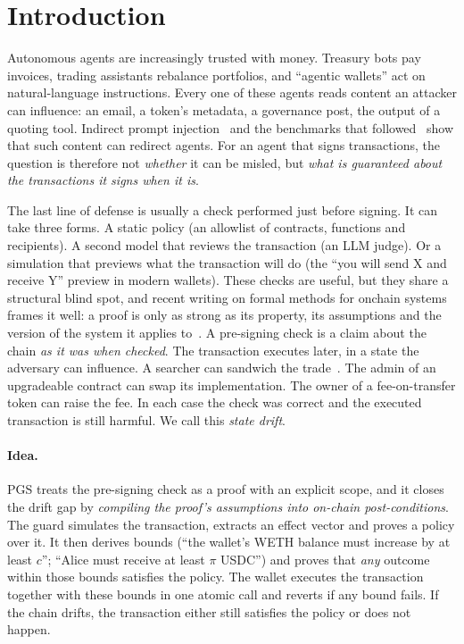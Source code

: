 \documentclass[11pt]{article}
\newcommand{\pgs}{\textsc{PGS}}
\begin{document}
\section{Introduction}
Autonomous agents are increasingly trusted with money. Treasury bots pay invoices, trading assistants rebalance portfolios, and ``agentic wallets'' act on natural-language instructions. Every one of these agents reads content an attacker can influence: an email, a token's metadata, a governance post, the output of a quoting tool. Indirect prompt injection~\cite{greshake2023not} and the benchmarks that followed~\cite{zhan2024injecagent,debenedetti2024agentdojo} show that such content can redirect agents. For an agent that signs transactions, the question is therefore not \emph{whether} it can be misled, but \emph{what is guaranteed about the transactions it signs when it is}.

The last line of defense is usually a check performed just before signing. It can take three forms. A static policy (an allowlist of contracts, functions and recipients). A second model that reviews the transaction (an LLM judge). Or a simulation that previews what the transaction will do (the ``you will send X and receive Y'' preview in modern wallets). These checks are useful, but they share a structural blind spot, and recent writing on formal methods for onchain systems frames it well: a proof is only as strong as its property, its assumptions and the version of the system it applies to~\cite{buterin2026fv,sherlock2026fv}. A pre-signing check is a claim about the chain \emph{as it was when checked}. The transaction executes later, in a state the adversary can influence. A searcher can sandwich the trade~\cite{daian2020flash,qin2022quantifying}. The admin of an upgradeable contract can swap its implementation. The owner of a fee-on-transfer token can raise the fee. In each case the check was correct and the executed transaction is still harmful. We call this \emph{state drift}.

\paragraph{Idea.} \pgs{} treats the pre-signing check as a proof with an explicit scope, and it closes the drift gap by \emph{compiling the proof's assumptions into on-chain post-conditions}. The guard simulates the transaction, extracts an effect vector and proves a policy over it. It then derives bounds (``the wallet's WETH balance must increase by at least $c$''; ``Alice must receive at least $\pi$ USDC'') and proves that \emph{any} outcome within those bounds satisfies the policy. The wallet executes the transaction together with these bounds in one atomic call and reverts if any bound fails. If the chain drifts, the transaction either still satisfies the policy or does not happen.
\end{document}
